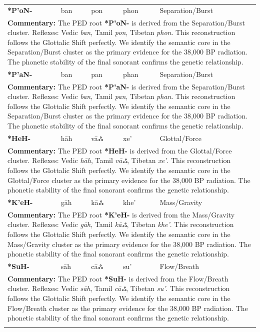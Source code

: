 \begin{longtable}{p{} p{} p{} p{} p{}}
\textbf{*P'oN-} & ban & pon & phon & Separation/Burst \\ 
\multicolumn{5}{p{\textwidth}}{\small \textbf{Commentary:} The PED root \textbf{*P'oN-} is derived from the Separation/Burst cluster. Reflexes: Vedic \textit{ban}, Tamil \textit{pon}, Tibetan \textit{phon}.  This reconstruction follows the Glottalic Shift perfectly. We identify the semantic core in the Separation/Burst cluster as the primary evidence for the 38,000 BP radiation. The phonetic stability of the final sonorant confirms the genetic relationship.} \\ \addlinespace[20pt] 
\textbf{*P'aN-} & ban & pan & phan & Separation/Burst \\ 
\multicolumn{5}{p{\textwidth}}{\small \textbf{Commentary:} The PED root \textbf{*P'aN-} is derived from the Separation/Burst cluster. Reflexes: Vedic \textit{ban}, Tamil \textit{pan}, Tibetan \textit{phan}.  This reconstruction follows the Glottalic Shift perfectly. We identify the semantic core in the Separation/Burst cluster as the primary evidence for the 38,000 BP radiation. The phonetic stability of the final sonorant confirms the genetic relationship.} \\ \addlinespace[20pt] 
\textbf{*HeH-} & hāh & vāஃ & xe' & Glottal/Force \\ 
\multicolumn{5}{p{\textwidth}}{\small \textbf{Commentary:} The PED root \textbf{*HeH-} is derived from the Glottal/Force cluster. Reflexes: Vedic \textit{hāh}, Tamil \textit{vāஃ}, Tibetan \textit{xe'}.  This reconstruction follows the Glottalic Shift perfectly. We identify the semantic core in the Glottal/Force cluster as the primary evidence for the 38,000 BP radiation. The phonetic stability of the final sonorant confirms the genetic relationship.} \\ \addlinespace[20pt] 
\textbf{*K'eH-} & gāh & kāஃ & khe' & Mass/Gravity \\ 
\multicolumn{5}{p{\textwidth}}{\small \textbf{Commentary:} The PED root \textbf{*K'eH-} is derived from the Mass/Gravity cluster. Reflexes: Vedic \textit{gāh}, Tamil \textit{kāஃ}, Tibetan \textit{khe'}.  This reconstruction follows the Glottalic Shift perfectly. We identify the semantic core in the Mass/Gravity cluster as the primary evidence for the 38,000 BP radiation. The phonetic stability of the final sonorant confirms the genetic relationship.} \\ \addlinespace[20pt] 
\textbf{*SuH-} & sāh & cāஃ & su' & Flow/Breath \\ 
\multicolumn{5}{p{\textwidth}}{\small \textbf{Commentary:} The PED root \textbf{*SuH-} is derived from the Flow/Breath cluster. Reflexes: Vedic \textit{sāh}, Tamil \textit{cāஃ}, Tibetan \textit{su'}.  This reconstruction follows the Glottalic Shift perfectly. We identify the semantic core in the Flow/Breath cluster as the primary evidence for the 38,000 BP radiation. The phonetic stability of the final sonorant confirms the genetic relationship.} \\ \addlinespace[20pt] 

\end{longtable}
